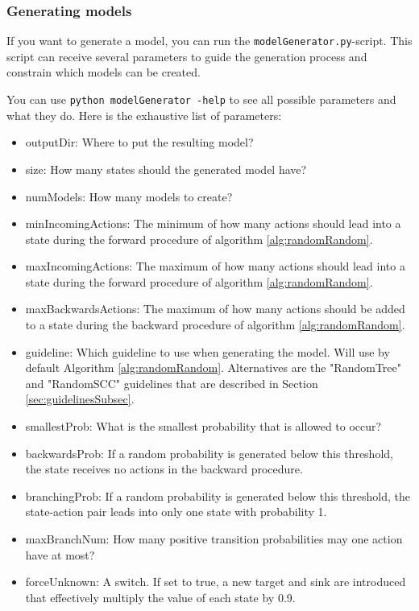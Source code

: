 \subsubsection*{Generating models} \label{sec:paramExplanation}
If you want to generate a model, you can run the \texttt{modelGenerator.py}-script.
This script can receive several parameters to guide the generation process and constrain which models can be created.

You can use \texttt{python modelGenerator -help} to see all possible parameters and what they do.
Here is the exhaustive list of parameters:
\begin{itemize} \label{list:params}
    \item outputDir: Where to put the resulting model?
    \item size: How many states should the generated model have?
    \item numModels: How many models to create?
    \item minIncomingActions: The minimum of how many actions should lead into a state during the forward procedure of algorithm \ref{alg:randomRandom}.
    \item maxIncomingActions: The maximum of how many actions should lead into a state during the forward procedure of algorithm \ref{alg:randomRandom}.
    \item maxBackwardsActions: The maximum of how many actions should be added to a state during the backward procedure of algorithm \ref{alg:randomRandom}.
    \item guideline: Which guideline to use when generating the model. Will use by default Algorithm \ref{alg:randomRandom}.
    Alternatives are the "RandomTree" and "RandomSCC" guidelines that are described in Section \ref{sec:guidelinesSubsec}.
    \item smallestProb: What is the smallest probability that is allowed to occur?
    \item backwardsProb: If a random probability is generated below this threshold, the state receives no actions in the backward procedure.
    \item branchingProb: If a random probability is generated below this threshold, the state-action pair leads into only one state with probability 1.
    \item maxBranchNum: How many positive transition probabilities may one action have at most?
    \item forceUnknown: A switch. If set to true, a new target and sink are introduced that effectively multiply the value of each state by 0.9.

\end{itemize}
